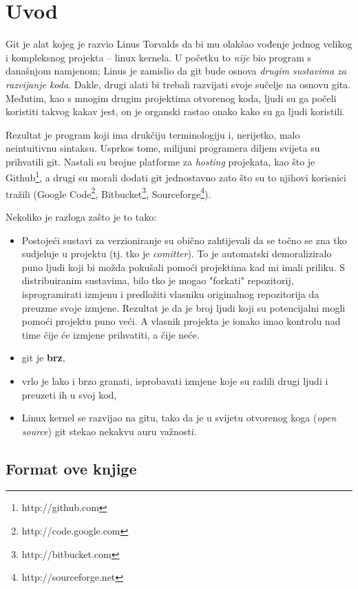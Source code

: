 \chapter*{Uvod}

Git je alat kojeg je razvio Linus Torvalds da bi mu olakšao vođenje jednog velikog i kompleksnog projekta -- linux kernela.
U početku to \emph{nije} bio program s današnjom namjenom; Linus je zamislio da git bude osnova \emph{drugim sustavima za razvijanje koda}.
Dakle, drugi alati bi trebali razvijati svoje sučelje na osnovu gita.
Međutim, kao s mnogim drugim projektima otvorenog koda, ljudi su ga počeli koristiti takvog kakav jest, on je organski rastao onako kako su ga ljudi koristili.

Rezultat je program koji ima drukčiju terminologiju i, nerijetko, malo neintuitivnu sintaksu. Usprkos tome, milijuni programera diljem svijeta su prihvatili git. 
Nastali su brojne platforme za \emph{hosting} projekata, kao što je Github\footnote{http://github.com}, a drugi su morali dodati git jednostavno zato što su to njihovi korisnici tražili (Google Code\footnote{http://code.google.com}, Bitbucket\footnote{http://bitbucket.com}, Sourceforge\footnote{http://sourceforge.net}).

Nekoliko je razloga zašto je to tako:

\begin{itemize}
	\item Postojeći sustavi za verzioniranje su obično zahtijevali da se točno se zna tko sudjeluje u projektu (tj. tko je \emph{comitter}). To je automatski demoraliziralo puno ljudi koji bi možda pokušali pomoći projektima kad mi imali priliku. S distribuiranim sustavima, bilo tko je mogao "forkati" repozitorij, isprogramirati izmjenu i predložiti vlasniku originalnog repozitorija da preuzme svoje izmjene. Rezultat je da je broj ljudi koji su potencijalni mogli pomoći projektu puno veći. A vlasnik projekta je ionako imao kontrolu nad time čije će izmjene prihvatiti, a čije neće.
	\item git je \textbf{brz},
	\item vrlo je lako i brzo granati, isprobavati izmjene koje su radili drugi ljudi i preuzeti ih u svoj kod,
	\item Linux kernel se razvijao na gitu, tako da je u svijetu otvorenog koga (\emph{open source}) git stekao nekakvu auru važnosti.
\end{itemize}

\section*{Format ove knjige}

